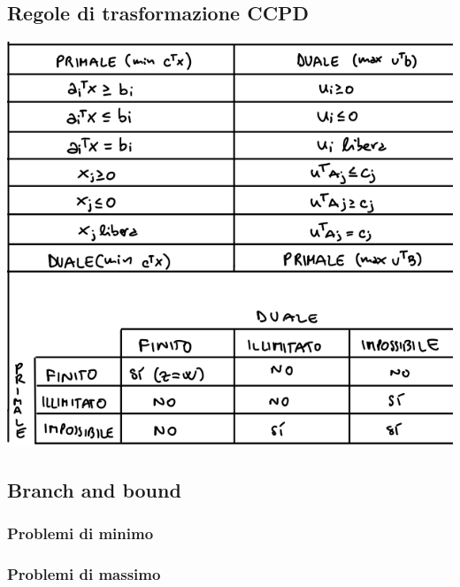 \begin{multicols}{2}
\subsection*{Regole di trasformazione CCPD}
\includegraphics[width=0.9\linewidth]{img/trasformazioneCCPD.png}
\subsection*{Branch and bound}
\subsubsection*{Problemi di minimo}
\subsubsection*{Problemi di massimo}


\end{multicols}
\restoregeometry